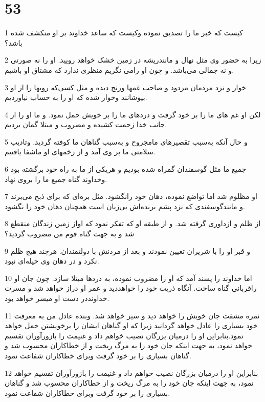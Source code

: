 \chapter{53}

\par 1 کیست که خبر ما را تصدیق نموده وکیست که ساعد خداوند بر او منکشف شده باشد؟
\par 2 زیرا به حضور وی مثل نهال و مانندریشه در زمین خشک خواهد رویید. او را نه صورتی و نه جمالی می‌باشد. و چون او رامی نگریم منظری ندارد که مشتاق او باشیم.
\par 3 خوار و نزد مردمان مردود و صاحب غمها ورنج دیده و مثل کسی‌که رویها را از او بپوشانند وخوار شده که او را به حساب نیاوردیم.
\par 4 لکن او غم های ما را بر خود گرفت و دردهای ما را بر خویش حمل نمود. و ما او را از جانب خدا زحمت کشیده و مضروب و مبتلا گمان بردیم.
\par 5 و حال آنکه به‌سبب تقصیرهای مامجروح و به‌سبب گناهان ما کوفته گردید. وتادیب سلامتی ما بر وی آمد و از زخمهای او ماشفا یافتیم.
\par 6 جمیع ما مثل گوسفندان گمراه شده بودیم و هریکی از ما به راه خود برگشته بود وخداوند گناه جمیع ما را بروی نهاد.
\par 7 او مظلوم شد اما تواضع نموده، دهان خود رانگشود. مثل بره‌ای که برای ذبح می‌برند و مانندگوسفندی که نزد پشم برنده‌اش بی‌زبان است همچنان دهان خود را نگشود.
\par 8 از ظلم و ازداوری گرفته شد. و از طبقه او که تفکر نمود که اواز زمین زندگان منقطع شد و به جهت گناه قوم من مضروب گردید؟
\par 9 و قبر او را با شریران تعیین نمودند و بعد از مردنش با دولتمندان. هرچند هیچ ظلم نکرد و در دهان وی حیله‌ای نبود.
\par 10 اما خداوند را پسند آمد که او را مضروب نموده، به دردها مبتلا سازد. چون جان او راقربانی گناه ساخت. آنگاه ذریت خود را خواهددید و عمر او دراز خواهد شد و مسرت خداونددر دست او میسر خواهد بود.
\par 11 ثمره مشقت جان خویش را خواهد دید و سیر خواهد شد. وبنده عادل من به معرفت خود بسیاری را عادل خواهد گردانید زیرا که او گناهان ایشان را برخویشتن حمل خواهد نمود.بنابراین او را درمیان بزرگان نصیب خواهم داد و غنیمت را بازورآوران تقسیم خواهد نمود، به جهت اینکه جان خود را به مرگ ریخت و از خطاکاران محسوب شد و گناهان بسیاری را بر خود گرفت وبرای خطاکاران شفاعت نمود. 
\par 12 بنابراین او را درمیان بزرگان نصیب خواهم داد و غنیمت را بازورآوران تقسیم خواهد نمود، به جهت اینکه جان خود را به مرگ ریخت و از خطاکاران محسوب شد و گناهان بسیاری را بر خود گرفت وبرای خطاکاران شفاعت نمود.
 
